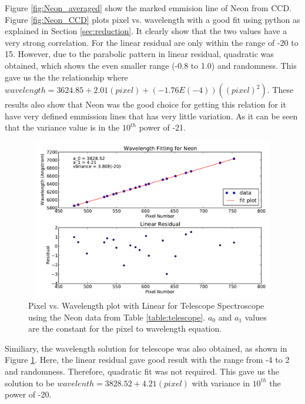 \documentclass[a4paper,12pt]{article}
\begin{document}
Figure \ref{fig:Neon_averaged} show the marked emmision line of Neon from CCD. Figure \ref{fig:Neon_CCD} plots pixel vs. wavelength with a good fit using python as explained in Section \ref{sec:reduction}. It clearly show that the two values have a very strong correlation. For the linear residual are only within the range of -20 to 15. However, due to the parabolic pattern in linear residual, quadratic was obtained, which shows the even smaller range (-0.8 to 1.0) and randomness. This gave us the the relationship where $wavelength = 3624.85 + 2.01(pixel) + (-1.76E(-4))((pixel)^2)$. These results also show that Neon was the good choice for getting this relation for it have very defined emmission lines that has very little variation. As it can be seen that the variance value is in the $10^{th}$ power of -21.
\begin{figure}[H]
\centering
\includegraphics [angle=0,height=7cm,width=13cm]{graphs/Night1NeonFit.pdf} 
\caption{Pixel vs. Wavelength plot with Linear for Telescope Spectroscope using the Neon data  from Table \ref{table:telescope}. $a_0$ and $a_1$ values are the constant for the pixel to wavelength equation.}
\label{fig:Neon_tele}
\end{figure}
Similiary, the wavelength solution for telescope was also obtained, as shown in Figure \ref{fig:Neon_tele}. Here, the linear residual gave good result with the range from -4 to 2 and randomness. Therefore, quadratic fit was not required. This gave us the solution to be $wavelenth = 3828.52 + 4.21(pixel)$ with variance in $10^{th}$ the power of -20.

\end{document}
